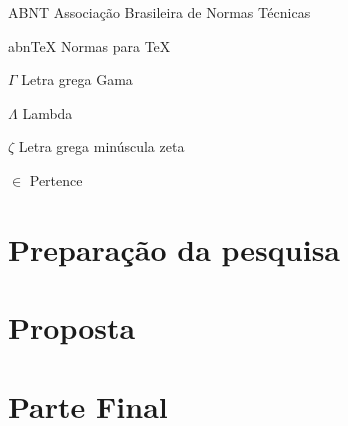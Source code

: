 \documentclass[12pt,openright,twoside,a4paper,brazil,english]{abntex2}
\begin{document}
\frenchspacing
\pretextual


\imprimirfolhaderosto*







\listoffigures*
\cleardoublepage

\listoftables*
\cleardoublepage

\begin{siglas}
  \item[ABNT] Associação Brasileira de Normas Técnicas
  \item[abnTeX] Normas para TeX
\end{siglas}

\begin{simbolos}
  \item[$ \Gamma $] Letra grega Gama
  \item[$ \Lambda $] Lambda
  \item[$ \zeta $] Letra grega minúscula zeta
  \item[$ \in $] Pertence
\end{simbolos}

\tableofcontents*
\cleardoublepage
\textual
{}
\setcounter{page}{1}

\part{Preparação da pesquisa}




\part{Proposta}

\part{Parte Final}


\postextual



\end{document}
